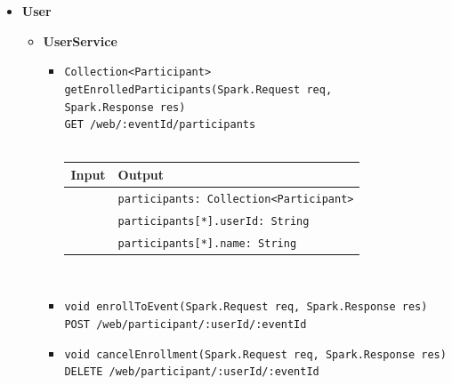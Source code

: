 \documentclass[a4paper, hidelinks, 12pt]{report}
\begin{document}
\begin{itemize}
		\item{\textbf{User}}
			\begin{itemize}
				\item{\textbf{UserService}}
					\begin{itemize}
						\item{\verb|Collection<Participant> getEnrolledParticipants(Spark.Request req, |\\ \verb|Spark.Response res)|\\ \verb|GET /web/:eventId/participants|}\\\\
				\begin{tabular}{l | l}
				\textbf{Input} & \textbf{Output} \\
				\hline
					& \verb|participants: Collection<Participant>| \\
					& \verb|participants[*].userId: String| \\
					& \verb|participants[*].name: String| \\
				\end{tabular}\\
				\item{\verb|void enrollToEvent(Spark.Request req, Spark.Response res)|\\ \verb|POST /web/participant/:userId/:eventId|}
				\item{\verb|void cancelEnrollment(Spark.Request req, Spark.Response res)|\\ \verb|DELETE /web/participant/:userId/:eventId|}
			\end{itemize}
		\end{itemize}
			

\end{itemize}
\end{document}
